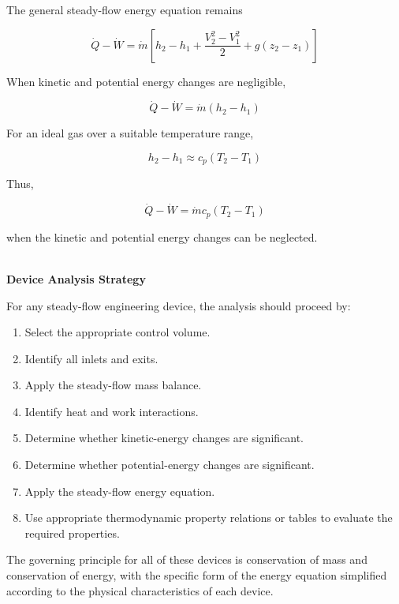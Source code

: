 \documentclass[12pt]{article}
\begin{document}
The general steady-flow energy equation remains

\begin{equation*}
\dot{Q}-\dot{W}
=
\dot{m}
\left[
h_2-h_1
+
\frac{V_2^2-V_1^2}{2}
+
g(z_2-z_1)
\right]
\end{equation*}

When kinetic and potential energy changes are negligible,

\begin{equation*}
\dot{Q}-\dot{W}
=
\dot{m}(h_2-h_1)
\end{equation*}

For an ideal gas over a suitable temperature range,

\begin{equation*}
h_2-h_1
\approx
c_p(T_2-T_1)
\end{equation*}

Thus,

\begin{equation*}
\dot{Q}-\dot{W}
=
\dot{m}c_p(T_2-T_1)
\end{equation*}

when the kinetic and potential energy changes can be neglected.

\newpage
\textbf{\\ Device Analysis Strategy}

For any steady-flow engineering device, the analysis should proceed by:

\begin{enumerate}
    \item Select the appropriate control volume.
    \item Identify all inlets and exits.
    \item Apply the steady-flow mass balance.
    \item Identify heat and work interactions.
    \item Determine whether kinetic-energy changes are significant.
    \item Determine whether potential-energy changes are significant.
    \item Apply the steady-flow energy equation.
    \item Use appropriate thermodynamic property relations or tables to evaluate the required properties.
\end{enumerate}

The governing principle for all of these devices is conservation of mass and conservation of energy, with the specific form of the energy equation simplified according to the physical characteristics of each device.
\end{document}
